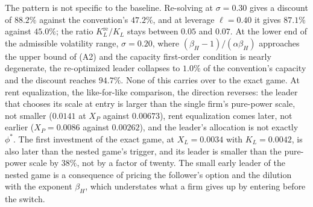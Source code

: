 \documentclass[
  11pt,
  letterpaper,
]{scrartcl}
\begin{document}
The pattern is not specific to the baseline. Re-solving at
\(\sigma = 0.30\) gives a discount of \(88.2\%\) against the
convention's \(47.2\%\), and at leverage \(\ell = 0.40\) it gives
\(87.1\%\) against \(45.0\%\); the ratio \(K_L^{\text{re}}/K_L\) stays
between \(0.05\) and \(0.07\). At the lower end of the admissible
volatility range, \(\sigma = 0.20\), where
\((\beta_H - 1)/(\alpha\beta_H)\) approaches the upper bound of (A2) and
the capacity first-order condition is nearly degenerate, the
re-optimized leader collapses to \(1.0\%\) of the convention's capacity
and the discount reaches \(94.7\%\). None of this carries over to the
exact game. At rent equalization, the like-for-like comparison, the
direction reverses: the leader that chooses its scale at entry is larger
than the single firm's pure-power scale, not smaller (\(0.0141\) at
\(X_P\) against \(0.00673\)), rent equalization comes later, not earlier
(\(X_P = 0.0086\) against \(0.00262\)), and the leader's allocation is
not exactly \(\phi^*\). The first investment of the exact game, at
\(X_L = 0.0034\) with \(K_L = 0.0042\), is also later than the nested
game's trigger, and its leader is smaller than the pure-power scale by
\(38\%\), not by a factor of twenty. The small early leader of the
nested game is a consequence of pricing the follower's option and the
dilution with the exponent \(\beta_H\), which understates what a firm
gives up by entering before the switch.
\end{document}
